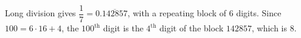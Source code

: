Long division gives $\dfrac{1}{7}=0.\overline{142857}$, with a repeating block of $6$ digits. Since $100=6\cdot16+4$, the $100^{\text{th}}$ digit is the $4^{\text{th}}$ digit of the block $142857$, which is $\boxed{8}$.
